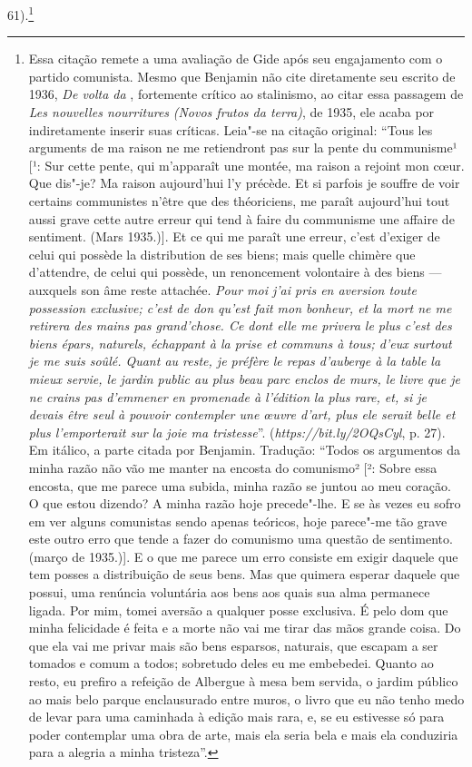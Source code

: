 61).\footnote{Essa citação remete a uma avaliação de Gide após seu
  engajamento com o partido comunista. Mesmo que Benjamin não cite
  diretamente seu escrito de 1936, \emph{De volta da },
  fortemente crítico ao stalinismo, ao citar essa passagem de \emph{Les
  nouvelles nourritures} \emph{(Novos frutos da terra)}, de 1935, ele
  acaba por indiretamente inserir suas críticas. Leia"-se na citação
  original: ``Tous les arguments de ma raison ne me retiendront pas sur
  la pente du communisme¹ {[}¹: Sur cette pente, qui m'apparaît une
  montée, ma raison a rejoint mon cœur. Que dis"-je? Ma raison
  aujourd'hui l'y précède. Et si parfois je souffre de voir certains
  communistes n'être que des théoriciens, me paraît aujourd'hui tout
  aussi grave cette autre erreur qui tend à faire du communisme une
  affaire de sentiment. (Mars 1935.){]}. Et ce qui me paraît une erreur,
  c'est d'exiger de celui qui possède la distribution de ses biens; mais
  quelle chimère que d'attendre, de celui qui possède, un renoncement
  volontaire à des biens --- auxquels son âme reste attachée. \emph{Pour
  moi j'ai pris en aversion toute possession exclusive; c'est de don
  qu'est fait mon bonheur, et la mort ne me retirera des mains pas
  grand'chose. Ce dont elle me privera le plus c'est des biens épars,
  naturels, échappant à la prise et communs à tous; d'eux surtout je me
  suis soûlé. Quant au reste, je préfère le repas d'auberge à la table
  la mieux servie, le jardin public au plus beau parc enclos de murs, le
  livre que je ne crains pas d'emmener en promenade à l'édition}
  \emph{la plus rare, et, si je devais être seul à pouvoir contempler
  une œuvre d'art, plus ele serait belle et plus l'}\emph{emporterait
  sur la joie ma tristesse}''.
  (\emph{https://bit.ly/2OQsCyl}, p. 27). Em itálico, a parte citada por Benjamin. Tradução: ``Todos os
  argumentos da minha razão não vão me manter na encosta do
  comunismo² [²: Sobre essa encosta, que me parece uma subida,
  minha razão se juntou ao meu coração. O que estou dizendo? A minha
  razão hoje precede"-lhe. E se às vezes eu sofro em ver alguns
  comunistas sendo apenas teóricos, hoje parece"-me tão grave este outro
  erro que tende a fazer do comunismo uma questão de sentimento. (março de 1935.)]. E o que me parece um erro consiste em exigir daquele
  que tem posses a distribuição de seus bens. Mas que quimera esperar
  daquele que possui, uma renúncia voluntária aos bens aos quais sua
  alma permanece ligada. Por mim, tomei aversão a qualquer posse
  exclusiva. É pelo dom que minha felicidade é feita e a morte não vai
  me tirar das mãos grande coisa. Do que ela vai me privar mais são bens
  esparsos, naturais, que escapam a ser tomados e comum a todos;
  sobretudo deles eu me embebedei. Quanto ao resto, eu prefiro a
  refeição de Albergue à mesa bem servida, o jardim público ao mais belo
  parque enclausurado entre muros, o livro que eu não tenho medo de
  levar para uma caminhada à edição mais rara, e, se eu estivesse só
  para poder contemplar uma obra de arte, mais ela seria bela e mais ela
  conduziria para a alegria a minha tristeza''. \versal{[N. E.]}}

